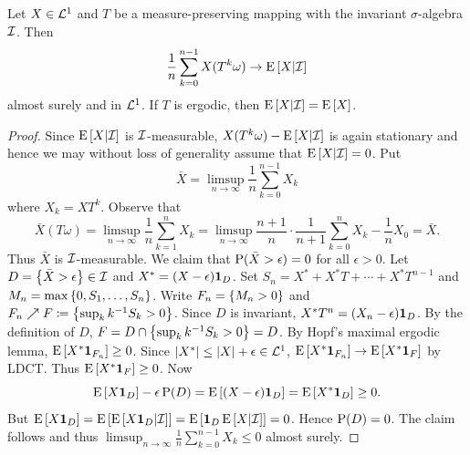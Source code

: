 \begin{theorem}
    Let $X\in\L^1$ and $T$ be a measure-preserving mapping with the invariant 
    $\sigma$-algebra $\I$. Then 
    \begin{equation*}
        \frac{1}{n}\sum_{k=0}^{n-1}X(T^k\omega)\to \E\sbrc{X|\I}
    \end{equation*}
    almost surely and in $\L^1$. If $T$ is ergodic, then $\E\sbrc{X|\I} 
    = \E\sbrc{X}$. 
\end{theorem}
\begin{proof}
    Since $\E\sbrc{X|\I}$ is $\I$-measurable, $X(T^k\omega) - \E\sbrc{X|\I}$ 
    is again stationary and hence we may without loss of generality 
    assume that $\E\sbrc{X|\I}=0$. Put 
    \begin{equation*}
        \bar{X} = \limsup_{n\to\infty}\frac{1}{n}\sum_{k=0}^{n-1} X_k
    \end{equation*}
    where $X_k = XT^k$. Observe that 
    \begin{equation*}
        \bar{X}(T\omega) = \limsup_{n\to\infty}\frac{1}{n}\sum_{k=1}^{n} X_k 
        = \limsup_{n\to\infty}\frac{n+1}{n}\cdot\frac{1}{n+1}\sum_{k=0}^{n} X_k  - \frac{1}{n}X_0 
        = \bar{X}.
    \end{equation*}
    Thus $\bar{X}$ is $\I$-measurable. We claim that $\P(\bar{X}>\epsilon) = 0$ 
    for all $\epsilon>0$. Let $D = \set{\bar{X}>\epsilon}\in\I$ and 
    $X^* = (X-\epsilon)\one_D$. Set $S_n = X^* + X^*T + \cdots + X^*T^{n-1}$ 
    and $M_n = \max\set{0,S_1,\ldots,S_n}$. Write $F_n = \set{M_n>0}$ 
    and $F_n\nearrow F \coloneq \set{\sup_{k}k^{-1}S_k>0}$. Since $D$ is 
    invariant, $X^*T^n = (X_n-\epsilon)\one_D$. By the definition 
    of $D$, $F = D\cap \set{\sup_{k}k^{-1}S_k>0} = D$. By Hopf's 
    maximal ergodic lemma, $\E\sbrc{X^*\one_{F_n}}\geq 0$. Since 
    $\abs{X^*}\leq \abs{X}+\epsilon\in\L^1$, $\E\sbrc{X^*\one_{F_n}}
    \to\E\sbrc{X^*\one_F}$ by LDCT. Thus $\E\sbrc{X^*\one_F}\geq 0$. 
    Now 
    \begin{equation*}
        \E\sbrc{X\one_D} - \epsilon\P(D) = \E\sbrc{(X-\epsilon)\one_D} = \E\sbrc{X^*\one_D}\geq 0. 
    \end{equation*}
    But $\E\sbrc{X\one_D} = \E\sbrc{\E\sbrc{X\one_D|\I}} = \E\sbrc{\one_D\E\sbrc{X|\I}} = 0$. 
    Hence $\P(D) = 0$. The claim follows and thus $\limsup_{n\to\infty}\frac{1}{n}\sum_{k=0}^{n-1} X_k\leq 0$ 
    almost surely. 


\end{proof}
